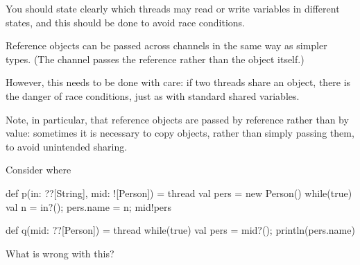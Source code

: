 You should state clearly which threads may read or write variables in
different states, and this should be done to avoid race conditions.



Reference objects can be passed across channels in the same way as simpler
types.  (The channel passes the reference rather than the object itself.)

However, this needs to be done with care: if two threads share an object,
there is the danger of race conditions, just as with standard shared
variables. 
 
Note, in particular, that reference objects are passed by reference rather
than by value: sometimes it is necessary to copy objects, rather than simply
passing them, to avoid unintended sharing.

Consider  where
%
\begin{scala}
def p(in: ??[String], mid: ![Person]) = thread{
  val pers = new Person()
  while(true){ val n = in?(); pers.name = n; mid!pers }
}

def q(mid: ??[Person]) = thread{
  while(true){ val pers = mid?(); println(pers.name) }
} 
\end{scala}
%
What is wrong with this?

